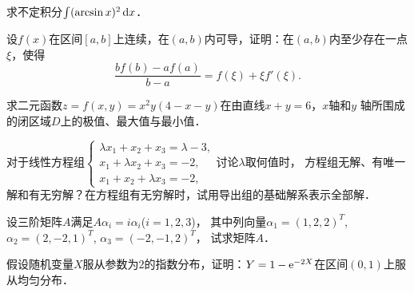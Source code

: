 \documentclass[plain,noanswer,medmath]{../../template/jnuexam}
\begin{document}






\begin{problem}
求不定积分$\int (\arcsin x)^2 \mathop{}\!\mathrm{d} x$．
\end{problem}









\begin{problem}
设$f(x)$在区间$[a,b]$上连续，在$(a,b)$内可导，证明：在$(a,b)$内至少存在一点$\xi$，使得
$$\frac{bf(b) - af(a)}{b - a} = f(\xi) + \xi f'(\xi).$$
\end{problem}



\begin{problem}
求二元函数$z = f(x,y) = x^2 y(4 - x - y)$在由直线$x + y = 6$，$x$轴和$y$
轴所围成的闭区域$D$上的极值、最大值与最小值．
\end{problem}



\begin{problem}
对于线性方程组$\begin{cases}
  \lambda x_1 + x_2 + x_3 = \lambda - 3, \\
  x_1 + \lambda x_2 + x_3 = - 2, \\
  x_1 + x_2 + \lambda x_3 = - 2,
\end{cases}$讨论$\lambda$取何值时，
方程组无解、有唯一解和有无穷解？在方程组有无穷解时，试用导出组的基础解系表示全部解．
\end{problem}



\begin{problem}
设三阶矩阵$A$满足$A\alpha_i = i\alpha_i$($i = 1,2,3$)，
其中列向量$\alpha_1 = (1,2,2)^T$, $\alpha_2 = (2,-2,1)^T$, $\alpha_3 = (-2,-1,2)^T$，
试求矩阵$A$．
\end{problem}






\begin{problem}
假设随机变量$X$服从参数为$2$的指数分布，证明：$Y = 1 - \mathrm{e}^{-2X}$在区间$(0,1)$上服从均匀分布．
\end{problem}
\end{document}
